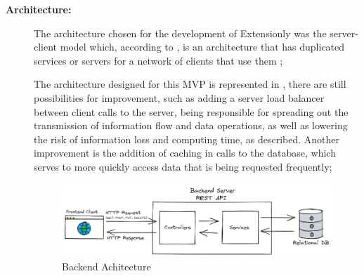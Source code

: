 \begin{description}
    
    \item[\textbf{Architecture:}] The architecture chosen for the development of Extensionly was the server-client model which, according to \textcite{puliafito_riccobene_scarpa}, is an architecture that has duplicated services or servers for a network of clients that use them ;
    
    
    The architecture designed for this \ac{MVP} is represented in , there are still possibilities for improvement, such as adding a server load balancer between client calls to the server, being responsible for spreading out the transmission of information flow and data operations, as well as lowering the risk of information loss and computing time, as \textcite{Chen_2015} described.
    Another improvement is the addition of caching in calls to the database, which serves to more quickly access data that is being requested frequently;
    
    \begin{figure}[htb]
      \caption{Backend Achitecture}\label{fig:architecture}
      \begin{center}
        \includegraphics[width=15cm]{img/6-architecture.png}
      \end{center}
    \end{figure}
    

\end{description}

